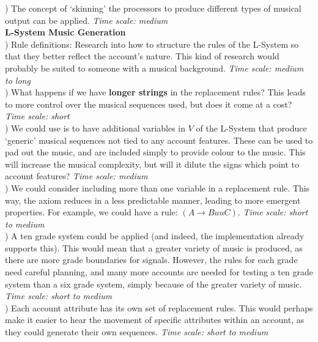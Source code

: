 ) The concept of `skinning' the processors to produce different types of musical output can be applied. \textit{Time scale: medium} \\

\noindent \textbf{L-System Music Generation} \\

) Rule definitions: Research into how to structure the rules of the L-System so that they better reflect the account's nature. This kind of research would probably be suited to someone with a musical background. \textit{Time scale: medium to long}\\

) What happens if we have \textbf{longer strings} in the replacement rules? This leads to more control over the musical sequences used, but does it come at a cost? \textit{Time scale: short} \\

) We could use is to have additional variables in $V$ of the L-System that produce `generic' musical sequences not tied to any account features. These can be used to pad out the music, and are included simply to provide colour to the music. This will increase the musical complexity, but will it dilute the signs which point to account features? \textit{Time scale: medium} \\

) We could consider including more than one variable in a replacement rule. This way, the axiom reduces in a less predictable manner, leading to more emergent properties. For example, we could have a rule: $(A \rightarrow BuuC)$. \textit{Time scale: short to medium} \\

) A ten grade system could be applied (and indeed, the implementation already supports this). This would mean that a greater variety of music is produced, as there are more grade boundaries for signals. However, the rules for each grade need careful planning, and many more accounts are needed for testing a ten grade system than a six grade system, simply because of the greater variety of music. \textit{Time scale: short to medium} \\

) Each account attribute has its own set of replacement rules. This would perhaps make it easier to hear the movement of specific attributes within an account, as they could generate their own sequences. \textit{Time scale: short to medium} \\

